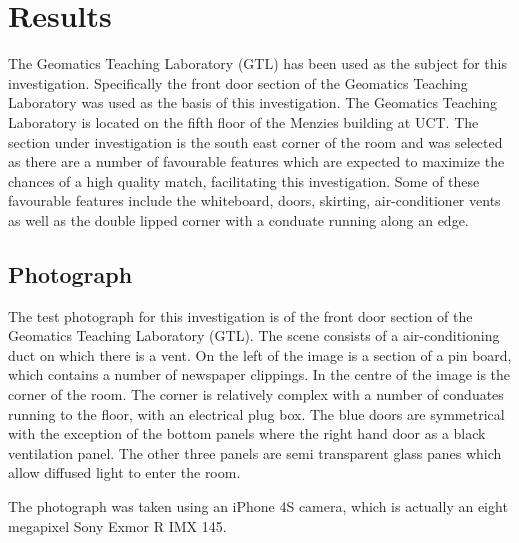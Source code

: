 \documentclass[11pt,a4paper]{report}
\begin{document}
\chapter{Results}
	The Geomatics Teaching Laboratory (GTL) has been used as the subject for this investigation. Specifically the front door section of the Geomatics Teaching Laboratory was used as the basis of this investigation. The Geomatics Teaching Laboratory is located on the fifth floor of the Menzies building at UCT. The section under investigation is the south east corner of the room and was selected as there are a number of favourable features which are expected to maximize the chances of a high quality match, facilitating this investigation. Some of these favourable features include the whiteboard, doors, skirting, air-conditioner vents as well as the double lipped corner with a conduate running along an edge.
	
	\section{Photograph}
		The test photograph for this investigation is of the front door section of the Geomatics Teaching Laboratory (GTL). The scene consists of a air-conditioning duct on which there is a vent. On the left of the image is a section of a pin board, which contains a number of newspaper clippings. In the centre of the image is the corner of the room. The corner is relatively complex with a number of conduates running to the floor, with an electrical plug box. The blue doors are symmetrical with the exception of the bottom panels where the right hand door as a black ventilation panel. The other three panels are semi transparent glass panes which allow diffused light to enter the room.
		
		The photograph was taken using an iPhone 4S camera, which is actually an eight megapixel Sony Exmor R IMX 145.
		
\end{document}
